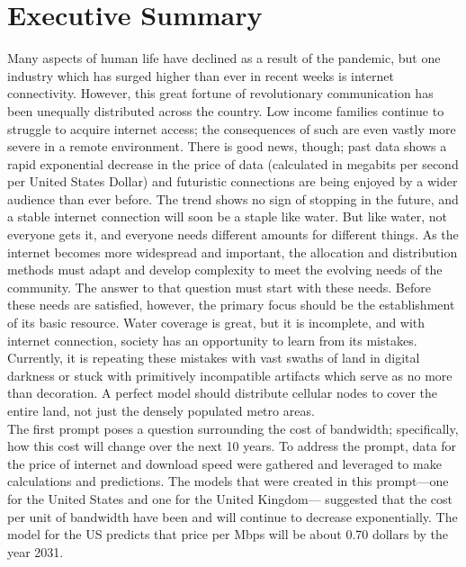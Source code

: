 
\section*{Executive Summary}
    \indent Many aspects of human life have declined as a result of the pandemic, but one industry which has surged higher than ever in recent weeks is internet connectivity. However, this great fortune of revolutionary communication has been unequally distributed across the country. Low income families continue to struggle to acquire internet access; the consequences of such are even vastly more severe in a remote environment. There is good news, though; past data shows a rapid exponential decrease in the price of data (calculated in megabits per second per United States Dollar) and futuristic connections are being enjoyed by a wider audience than ever before. The trend shows no sign of stopping in the future, and a stable internet connection will soon be a staple like water. But like water, not everyone gets it, and everyone needs different amounts for different things. As the internet becomes more widespread and important, the allocation and distribution methods must adapt and develop complexity to meet the evolving needs of the community. The answer to that question must start with these needs. Before these needs are satisfied, however, the primary focus should be the establishment of its basic resource. Water coverage is great, but it is incomplete, and with internet connection, society has an opportunity to learn from its mistakes. Currently, it is repeating these mistakes with vast swaths of land in digital darkness or stuck with primitively incompatible artifacts which serve as no more than decoration. A perfect model should distribute cellular nodes to cover the entire land, not just the densely populated metro areas. \\
	\indent The first prompt poses a question surrounding the cost of bandwidth; specifically, how this cost will change over the next 10 years. To address the prompt, data for the price of internet and download speed were gathered and leveraged to make calculations and predictions. The models that were created in this prompt—one for the United States and one for the United Kingdom— suggested that the cost per unit of bandwidth have been and will continue to decrease exponentially. The model for the US predicts that price per Mbps will be about 0.70 dollars by the year 2031. \\
